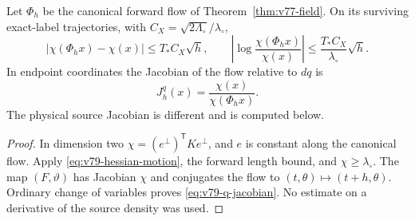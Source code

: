 \begin{corollary}
\label{cor:v79-angular-jacobian}
Let $\Phi_h$ be the canonical forward flow of
Theorem~\ref{thm:v77-field}. On its surviving exact-label trajectories,
with $C_X=\sqrt{2\Lambda_\circ}/\lambda_\circ$,
\begin{equation}\label{eq:v79-chi-motion}
 |\chi(\Phi_hx)-\chi(x)|\le T_*C_X\sqrt h,\qquad
 \left|\log\frac{\chi(\Phi_hx)}{\chi(x)}\right|
                         \le\frac{T_*C_X}{\lambda_\circ}\sqrt h.
\end{equation}
In endpoint coordinates the Jacobian of the flow relative to $dq$ is
\begin{equation}\label{eq:v79-q-jacobian}
               J_h^q(x)=\frac{\chi(x)}{\chi(\Phi_hx)}.
\end{equation}
The physical source Jacobian is different and is computed below.
\end{corollary}
\begin{proof}
In dimension two $\chi=(e^\perp)^{\mathsf T}Ke^\perp$, and $e$ is
constant along the canonical flow. Apply
\eqref{eq:v79-hessian-motion}, the forward length bound, and
$\chi\ge\lambda_\circ$. The map $(F,\vartheta)$ has Jacobian $\chi$
and conjugates the flow to $(t,\theta)\mapsto(t+h,\theta)$.
Ordinary change of variables proves \eqref{eq:v79-q-jacobian}.
No estimate on a derivative of the source density was used.
\end{proof}
